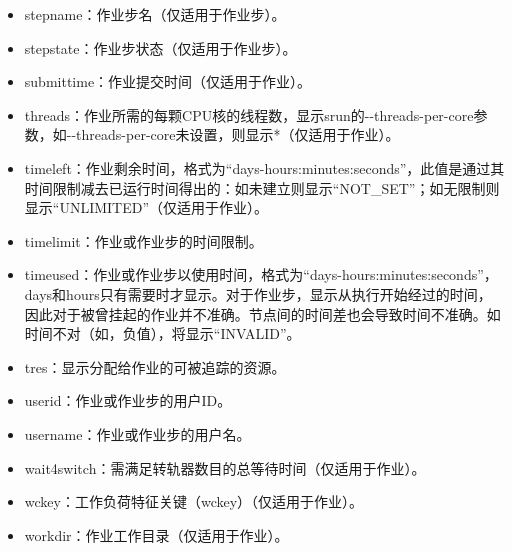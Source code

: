\begin{itemize}
\begin{itemize}
\begin{itemize}
    \item stepname：作业步名（仅适用于作业步）。
    \item stepstate：作业步状态（仅适用于作业步）。
    \item submittime：作业提交时间（仅适用于作业）。
    \item threads：作业所需的每颗CPU核的线程数，显示srun的-{}-threads-per-core参数，如-{}-threads-per-core未设置，则显示*（仅适用于作业）。
    \item timeleft：作业剩余时间，格式为``days-hours:minutes:seconds''，此值是通过其时间限制减去已运行时间得出的：如未建立则显示``NOT\_SET''；如无限制则显示``UNLIMITED''（仅适用于作业）。
    \item timelimit：作业或作业步的时间限制。
    \item timeused：作业或作业步以使用时间，格式为``days-hours:minutes:seconds''，days和hours只有需要时才显示。对于作业步，显示从执行开始经过的时间，因此对于被曾挂起的作业并不准确。节点间的时间差也会导致时间不准确。如时间不对（如，负值），将显示``INVALID''。
    \item tres：显示分配给作业的可被追踪的资源。
    \item userid：作业或作业步的用户ID。
    \item username：作业或作业步的用户名。
    \item wait4switch：需满足转轨器数目的总等待时间（仅适用于作业）。
    \item wckey：工作负荷特征关键（wckey）（仅适用于作业）。
    \item workdir：作业工作目录（仅适用于作业）。
\end{itemize}
\end{itemize}
\end{itemize}

